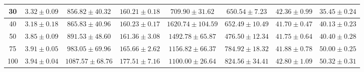 \begin{table}
\begin{center}
\begin{tabular}{|c||c|c|c|c|c|c|c|}
\\
\hline 
 30  &$3.32\pm0.09$ & $856.82\pm40.32$  &  $160.21\pm0.18$  & $709.90\pm31.62$   &  $650.54\pm7.23$ &$42.36\pm0.99$ &  $35.45\pm0.24$  
\\
\hline
 40 & $3.18\pm0.18$ & $865.83\pm40.96$  &  $160.23\pm0.17$  & $1620.74\pm104.59$   &  $652.49\pm10.49$&$41.70\pm0.47$   &  $40.13\pm0.23$   
\\
\hline
 50  & $3.85\pm0.09$ & $891.53\pm48.60$  &  $161.36\pm3.08$  & $1492.78\pm65.87 $   &  $476.50\pm12.34$&$41.75\pm0.64$  &  $40.40\pm0.28$    
\\
\hline
 75  & $3.91\pm0.05$ & $983.05\pm69.96$  &  $165.66\pm2.62 $  & $1156.82\pm66.37$   &  $784.92\pm18.32$ &$41.88\pm0.78$ &  $50.00\pm0.25$  
\\
\hline
 100  & $3.94\pm0.04$ & $1087.57\pm68.76 $  &  $177.51\pm7.16$  & $1100.00\pm26.64$   &  $824.56\pm34.41$ &$42.80\pm1.09$ &  $50.32\pm0.31$    
\\
\hline
\end{tabular}
\end{center}
\end{table}

